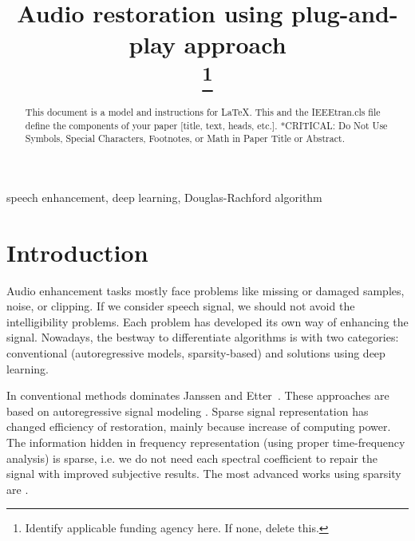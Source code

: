 \documentclass[conference]{IEEEtran}
\begin{document}
\title{Audio restoration using plug-and-play approach\\
	{}
\thanks{Identify applicable funding agency here. If none, delete this.}
}

\author{
\and
{}

}

\maketitle

\begin{abstract}
This document is a model and instructions for \LaTeX.
This and the IEEEtran.cls file define the components of your paper [title, text, heads, etc.]. *CRITICAL: Do Not Use Symbols, Special Characters, Footnotes, 
or Math in Paper Title or Abstract.
\end{abstract}

\begin{IEEEkeywords}
speech enhancement, deep learning, Douglas-Rachford algorithm
\end{IEEEkeywords}

\section{Introduction}

Audio enhancement tasks mostly face problems like missing or damaged samples, noise, or clipping.
If we consider speech signal, we should not avoid the intelligibility problems.
Each problem has developed its own way of enhancing the signal.
Nowadays, the bestway to differentiate algorithms is with two categories:
conventional (autoregressive models, sparsity-based) and solutions using deep learning.

In conventional methods dominates Janssen \cite{Janssen1986} and Etter~\cite{Etter1996}.
These approaches are based on autoregressive signal modeling \cite{Mokry2020}.
Sparse signal representation has changed efficiency of restoration, mainly because increase of computing power.
The information hidden in frequency representation (using proper time-frequency analysis) is sparse, i.e. we do not need each spectral coefficient to repair the signal with improved subjective results.
The most advanced works using sparsity are \cite{Adler2012,Kitic2015,Zaviska2019, Mokry2019}.
\end{document}
